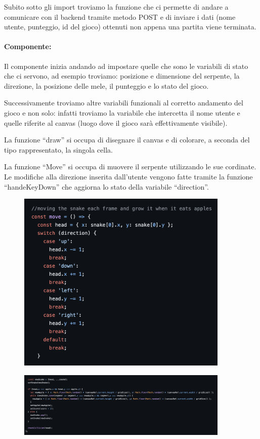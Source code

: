 \documentclass{article}
\begin{document}
Subito sotto gli import troviamo la funzione che ci permette di andare a comunicare con il backend tramite metodo POST e di inviare i dati (nome utente, punteggio, id del gioco) ottenuti non appena una partita viene terminata.


\paragraph{Componente:}
Il componente inizia andando ad impostare quelle che sono le variabili di stato che ci servono, ad esempio troviamo: posizione e dimensione del serpente, la direzione, la posizione delle mele, il punteggio e lo stato del gioco. 

Successivamente troviamo altre variabili funzionali al corretto andamento del gioco e non solo: infatti troviamo la variabile che intercetta il nome utente e quelle riferite al canvas (luogo dove il gioco sarà effettivamente visibile).

La funzione “draw” si occupa di disegnare il canvas e di colorare, a seconda del tipo rappresentato, la singola cella.

La funzione “Move” si occupa di muovere il serpente utilizzando le sue cordinate.
Le modifiche alla direzione inserita dall’utente vengono fatte tramite la funzione “handeKeyDown” che aggiorna lo stato della variabile “direction”.

\begin{figure}[H]
    \centering
    \includegraphics[width=0.9\textwidth]{images/snake_move1.png}
\end{figure}
\begin{figure}[H]
    \centering
    \includegraphics[width=0.9\textwidth]{images/snake_move2.png}
\end{figure}
\end{document}
